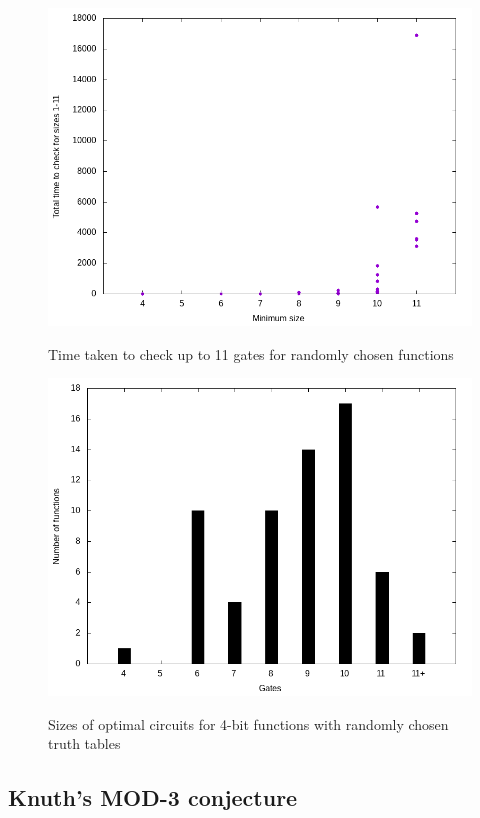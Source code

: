 \documentclass{article}
\begin{document}
\begin{figure}[!ht]
  \includegraphics[width=\textwidth]{images/random/4bit_scatter.png}
  \label{fig:4rand_scatter}
  \caption{Time taken to check up to 11 gates for randomly chosen functions}
\end{figure}
\begin{figure}[!ht]
  \includegraphics[width=\textwidth]{images/random/4bit_sizes.png}
  \label{fig:4rand_sizes}
  \caption{Sizes of optimal circuits for 4-bit functions with randomly chosen truth tables}

\end{figure}

\subsection{Knuth's MOD-3 conjecture}
\end{document}
